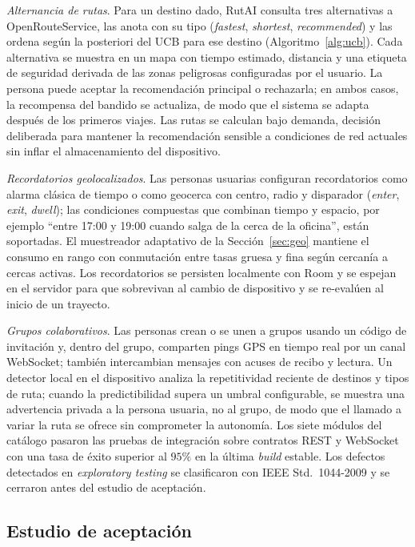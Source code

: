 \documentclass[a4paper,fleqn]{cas-sc}
\newcommand{\RUTAI}{RutAI\xspace}
\newcommand{\UCB}{UCB\xspace}
\begin{document}
	\emph{Alternancia de rutas}. Para un destino dado, \RUTAI consulta tres alternativas a OpenRouteService, las anota con su tipo (\emph{fastest}, \emph{shortest}, \emph{recommended}) y las ordena seg\'un la posteriori del \UCB para ese destino (Algoritmo~\ref{alg:ucb}). Cada alternativa se muestra en un mapa con tiempo estimado, distancia y una etiqueta de seguridad derivada de las zonas peligrosas configuradas por el usuario. La persona puede aceptar la recomendaci\'on principal o rechazarla; en ambos casos, la recompensa del bandido se actualiza, de modo que el sistema se adapta despu\'es de los primeros viajes. Las rutas se calculan bajo demanda, decisi\'on deliberada para mantener la recomendaci\'on sensible a condiciones de red actuales sin inflar el almacenamiento del dispositivo.
	
	\emph{Recordatorios geolocalizados}. Las personas usuarias configuran recordatorios como alarma cl\'asica de tiempo o como geocerca con centro, radio y disparador (\emph{enter}, \emph{exit}, \emph{dwell}); las condiciones compuestas que combinan tiempo y espacio, por ejemplo ``entre 17:00 y 19:00 cuando salga de la cerca de la oficina'', est\'an soportadas. El muestreador adaptativo de la Secci\'on~\ref{sec:geo} mantiene el consumo en rango con conmutaci\'on entre tasas gruesa y fina seg\'un cercan\'ia a cercas activas. Los recordatorios se persisten localmente con Room y se espejan en el servidor para que sobrevivan al cambio de dispositivo y se re-eval\'uen al inicio de un trayecto.
	
	\emph{Grupos colaborativos}. Las personas crean o se unen a grupos usando un c\'odigo de invitaci\'on y, dentro del grupo, comparten pings GPS en tiempo real por un canal WebSocket; tambi\'en intercambian mensajes con acuses de recibo y lectura. Un detector local en el dispositivo analiza la repetitividad reciente de destinos y tipos de ruta; cuando la predictibilidad supera un umbral configurable, se muestra una advertencia privada a la persona usuaria, no al grupo, de modo que el llamado a variar la ruta se ofrece sin comprometer la autonom\'ia. Los siete m\'odulos del cat\'alogo pasaron las pruebas de integraci\'on sobre contratos REST y WebSocket con una tasa de \'exito superior al $95\%$ en la \'ultima \emph{build} estable. Los defectos detectados en \emph{exploratory testing} se clasificaron con IEEE Std.~1044-2009 y se cerraron antes del estudio de aceptaci\'on.
	
	\subsection{Estudio de aceptaci\'on}\label{sec:results-tam}
	
\end{document}
